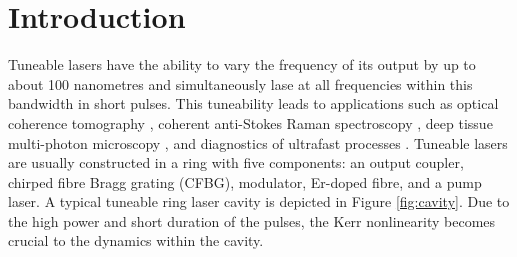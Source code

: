 \documentclass[10pt,twocolumn,a4paper]{article}
\title{}
\author{B. Metherall \and C. S. Bohun}
\begin{document}
\twocolumn[
	\begin{@twocolumnfalse}
		\maketitle
		\begin{abstract}

		\end{abstract}
	\end{@twocolumnfalse}
]

\section{Introduction}
\label{sec:intro}
Tuneable lasers have the ability to vary the frequency of its output by up to about 100 nanometres \cite{bohun2015, burgoyne2010, yamashita2009} and simultaneously lase at all frequencies within this bandwidth in short pulses. This tuneability leads to applications such as optical coherence tomography \cite{bohun2015, burgoyne2014, yamashita2009}, coherent anti-Stokes Raman spectroscopy \cite{burgoyne2014}, deep tissue multi-photon microscopy \cite{chung2017, liu2017}, and diagnostics of ultrafast processes \cite{burgoyne2014, silfvast2004}. Tuneable lasers are usually constructed in a ring with five components: an output coupler, chirped fibre Bragg grating (CFBG), modulator, Er-doped fibre, and a pump laser. A typical tuneable ring laser cavity is depicted in Figure \ref{fig:cavity}. Due to the high power and short duration of the pulses, the Kerr nonlinearity becomes crucial to the dynamics within the cavity.
\end{document}
